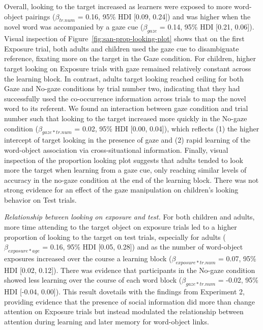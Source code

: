 \documentclass[man,floatsintext]{apa6}
\begin{document}
Overall, looking to the target increased as learners were exposed to
more word-object pairings (\(\beta_{tr.num}\) = 0.16, 95\% HDI {[}0.09,
0.24{]}) and was higher when the novel word was accompanied by a gaze
cue (\(\beta_{gaze}\) = 0.14, 95\% HDI {[}0.21, 0.06{]}). Visual
inspection of Figure~\ref{fig:san-prop-looking-plot} shows that on the
first Exposure trial, both adults and children used the gaze cue to
disambiguate reference, fixating more on the target in the Gaze
condition. For children, higher target looking on Exposure trials with
gaze remained relatively constant across the learning block. In
contrast, adults target looking reached ceiling for both Gaze and
No-gaze conditions by trial number two, indicating that they had
successfully used the co-occurrence information across trials to map the
novel word to its referent. We found an interaction between gaze
condition and trial number such that looking to the target increased
more quickly in the No-gaze condition (\(\beta_{gaze*tr.num}\) = 0.02,
95\% HDI {[}0.00, 0.04{]}), which reflects (1) the higher intercept of
target looking in the presence of gaze and (2) rapid learning of the
word-object association via cross-situational information. Finally,
visual inspection of the proportion looking plot suggests that adults
tended to look more the target when learning from a gaze cue, only
reaching similar levels of accuracy in the no-gaze condition at the end
of the learning block. There was not strong evidence for an effect of
the gaze manipulation on children's looking behavior on Test trials.

\emph{Relationship between looking on exposure and test.} For both
children and adults, more time attending to the target object on
exposure trials led to a higher proportion of looking to the target on
test trials, especially for adults (\(\beta_{exposure*age}\) = 0.16,
95\% HDI {[}0.05, 0.28{]}) and as the number of word-object exposures
increased over the course a learning block (\(\beta_{exposure*tr.num}\)
= 0.07, 95\% HDI {[}0.02, 0.12{]}). There was evidence that participants
in the No-gaze condition showed less learning over the course of each
word block (\(\beta_{gaze*tr.num}\) = -0.02, 95\% HDI {[}-0.04,
0.00{]}). This result dovetails with the findings from Experiment 2,
providing evidence that the presence of social information did more than
change attention on Exposure trials but instead modulated the
relationship between attention during learning and later memory for
word-object links.
\end{document}

